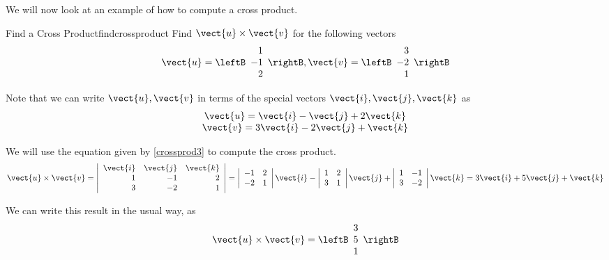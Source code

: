 We will now look at an example of how to compute a cross product.

\begin{example}{Find a Cross Product}{findcrossproduct}
Find $\vect{u} \times \vect{v}$ for the following vectors
\begin{equation*}
\vect{u}
=
\leftB
\begin{array}{r}
1 \\
-1 \\
2
\end{array}
\rightB,
\vect{v}
=
\leftB
\begin{array}{r}
3 \\
-2 \\
1
\end{array}
\rightB
\end{equation*}
\end{example}

\begin{solution}
Note that we can write $\vect{u}, \vect{v}$ in terms of the special vectors $\vect{i},
\vect{j}, \vect{k}$ as 
\begin{equation*}
\begin{array}{c}
\vect{u}
=
\vect{i}-\vect{j}+2\vect{k} \\
\vect{v}
=
 3\vect{i}-2\vect{j}+\vect{k}
\end{array}
\end{equation*}

We will use the equation given by \ref{crossprod3} to compute the cross product. 
\begin{equation*}
\vect{u} \times \vect{v}
=
\left\vert
\begin{array}{rrr}
\vect{i} & \vect{j} & \vect{k} \\
1 & -1 & 2 \\
3 & -2 & 1
\end{array}
\right\vert =\left\vert
\begin{array}{rr}
-1 & 2 \\
-2 & 1
\end{array}
\right\vert \vect{i}-\left\vert
\begin{array}{rr}
1 & 2 \\
3 & 1
\end{array}
\right\vert  \vect{j}+\left\vert
\begin{array}{rr}
1 & -1 \\
3 & -2
\end{array}
\right\vert \vect{k}=3\vect{i}+5\vect{j}+\vect{k}
\end{equation*}

We can write this result in the usual way, as
\begin{equation*}
\vect{u} \times \vect{v}
=
\leftB
\begin{array}{r}
3 \\
5 \\
1
\end{array}
\rightB
\end{equation*}

\end{solution}

